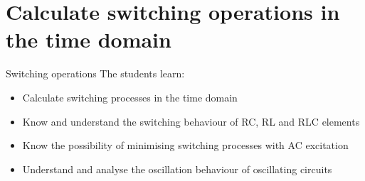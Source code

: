 
\section[Berechnung im Zeitbereich]{Calculate switching operations in the time domain}
\label{sec:schaltvorgaengezeitbereich}
\begin{frame}\ftx{\secname}
%
    \begin{Learning objectives}{Switching operations}
        The students learn:
        \begin{itemize}\b{\setlength\itemsep{0.7em}}
            \item Calculate switching processes in the time domain %
            \item Know and understand the switching behaviour of RC, RL and RLC elements %
            \item Know the possibility of minimising switching processes with AC excitation %
            \item Understand and analyse the oscillation behaviour of oscillating circuits %
        \end{itemize}
    \end{Learning objectives}
\end{frame}

